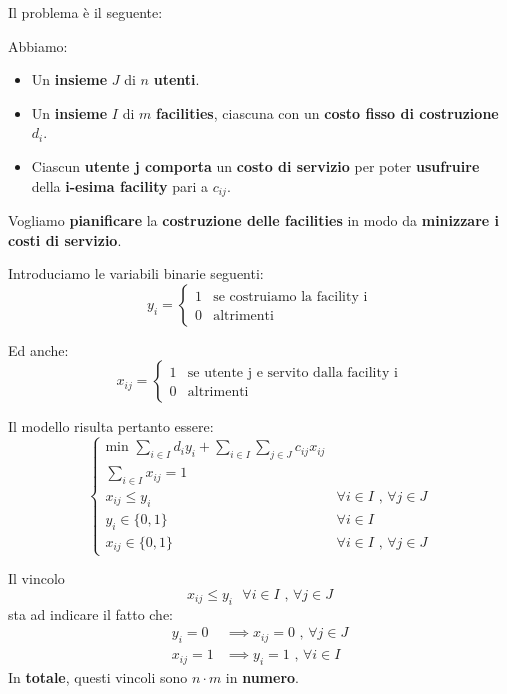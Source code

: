 Il problema è il seguente:

\begin{exa}
    Abbiamo:
    \begin{itemize}
        \item Un \textbf{insieme} $J$ di $n$ \textbf{utenti}.
        \item Un \textbf{insieme} $I$ di $m$ \textbf{facilities}, ciascuna
            con un \textbf{costo fisso di costruzione} $d_i$.
        \item Ciascun \textbf{utente j comporta} un \textbf{costo di servizio}
            per poter \textbf{usufruire} della \textbf{i-esima facility} 
            pari a $c_{ij}$.
    \end{itemize}
    Vogliamo \textbf{pianificare} la \textbf{costruzione delle facilities}
    in modo da \textbf{minizzare i costi di servizio}.
\end{exa}

Introduciamo le variabili binarie seguenti:
\[
    y_i = \begin{cases}
        1 & \text{se costruiamo la facility i} \\ 
        0 & \text{altrimenti}
    \end{cases}
\]

Ed anche:
\[
    x_{ij} = \begin{cases}
        1 & \text{se utente j e servito dalla facility i} \\ 
        0 & \text{altrimenti}
    \end{cases}
\]

Il modello risulta pertanto essere:
\[
    \begin{cases}
        \text{min } \sum_{i\in I} d_i y_i + 
        \sum_{i \in I} \sum_{j \in J} c_{ij} x_{ij} \\ 
        \sum_{i \in I} x_{ij} = 1 \\ 
        x_{ij} \le y_i & \forall i \in I \text{ , } \forall j \in J \\
        y_i \in \{0,1\} & \forall i \in I \\ 
        x_{ij} \in \{0,1\} & \forall i \in I \text{ , } \forall j \in J  
    \end{cases}
\]

\begin{remark}[VINCOLI]
    Il vincolo
    \[
        x_{ij} \le y_i \text{ } \forall i \in I \text{ , } \forall j \in J
    \] 
    sta ad indicare il fatto che:
    \[
        \begin{aligned}
            y_i = 0 &\implies x_{ij} = 0 \text{ , } \forall j \in J \\ 
            x_{ij} = 1 &\implies y_i = 1 \text{ , } \forall i \in I
        \end{aligned}
    \] 
    In \textbf{totale}, questi vincoli sono $n \cdot m$ in \textbf{numero}.
\end{remark}

